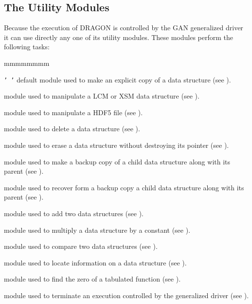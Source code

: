 \subsection{The Utility Modules}\label{sect:UtilityModules}

Because the execution of DRAGON is controlled by the GAN generalized driver it
can use directly any one of its utility modules. These modules perform the
following tasks:
 
\begin{ListeDeDescription}{mmmmmmmm}

\item[{\tt '~'}]  default module used to make an explicit copy of a data
structure (see ).

\item[\moc{UTL:}]  module used to manipulate a LCM or XSM data structure (see
).

\item[\moc{HUTL:}]  module used to manipulate a HDF5 file (see
).

\item[\moc{DELETE:}] module used to delete a data structure (see
).

\item[\moc{ERASE:}] module used to erase a data structure without destroying
its pointer (see ).

\item[\moc{BACKUP:}] module used to make a backup copy of a child data
structure along with its parent (see
).

\item[\moc{RECOVER:}] module used to recover form a backup copy a child data
structure along with its parent (see ).

\item[\moc{ADD:}] module used to add two data
structures (see ).

\item[\moc{MPX:}] module used to multiply a data
structure by a constant (see ).

\item[\moc{STAT:}] module used to compare two data
structures (see ).

\item[\moc{GREP:}] module used to locate information on a data
structure (see ).

\item[\moc{FIND0:}] module used to find the zero of a tabulated function (see
).

\item[\moc{END:}] module used to terminate an execution controlled by the
generalized driver (see ).

\end{ListeDeDescription}

